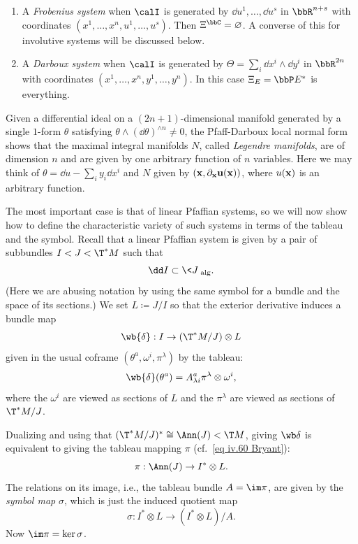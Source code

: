 \begin{example}
    \begin{enumerate}
        \item A \emph{Frobenius system} when $\calI$ is generated by $\dd u^1,\ldots,\dd u^s$ in $\bbR^{n+s}$ with coordinates $(x^1,\ldots,x^n,u^1,\ldots,u^s)$. Then $\Xi^\bbC=\varnothing$. A converse of this for involutive systems will be discussed below.
        \item A \emph{Darboux system} when $\calI$ is generated by $\Theta=\sum_i\dd x^i\wedge\dd y^i$ in $\bbR^{2n}$ with coordinates $(x^1,\ldots,x^n,y^1,\ldots,y^n)$. In this case $\Xi_E=\bbP E^\ast$ is everything.
    \end{enumerate}
\end{example}
\begin{rem}
    Given a differential ideal on a $(2n+1)$-dimensional manifold generated by a single $1$-form $\theta$ satisfying $\theta\wedge(\dd\theta)^{\wedge n}\neq 0$, the Pfaff-Darboux local normal form shows that the maximal integral manifolds $N$, called \emph{Legendre manifolds}, are of dimension $n$ and are given by one arbitrary function of $n$ variables. Here we may think of $\theta=\dd u-\sum_i y_i\dd x^i$ and $N$ given by $(\bf{x},\partial_{\bf{x}}u(\bf{x}))$, where $u(\bf{x})$ is an arbitrary function.
\end{rem}


The most important case is that of linear Pfaffian systems, so we will now show how to define the characteristic variety of such systems in terms of the tableau and the symbol. Recall that a linear Pfaffian system is given by a pair of subbundles $I<J<\T^\ast M$ such that 
\[\dd I\subset \<J\>_{\mathrm{alg}}.\]
(Here we are abusing notation by using the same symbol for a bundle and the space of its sections.) We set $L\coloneqq J\slash I$ so that the exterior derivative induces a bundle map 
\[\wb{\delta}:I\to (\T^\ast M\slash J)\otimes L\]
given in the usual coframe $(\theta^a,\omega^i,\pi^\lambda)$ by the tableau:
\[\wb{\delta}(\theta^a)=A^a_{\lambda i}\pi^\lambda\otimes \omega^i,\]
where the $\omega^i$ are viewed as sections of $L$ and the $\pi^\lambda$ are viewed as sections of $\T^\ast M\slash J$.

Dualizing and using that $(\T^\ast M\slash J)^\ast\cong \Ann(J)<\T M$, giving $\wb\delta$ is equivalent to giving the tableau mapping $\pi$ (cf.~\ref{eq iv.60 Bryant}):
\[\pi:\Ann(J)\to I^\ast\otimes L.\]
The relations on its image, i.e., the tableau bundle $A=\im \pi$, are given by the \emph{symbol map} $\sigma$, which is just the induced quotient map 
\[\sigma:I^\ast\otimes L\to (I^\ast\otimes L)\slash A.\]
Now $\im \pi=\ker\sigma$.

